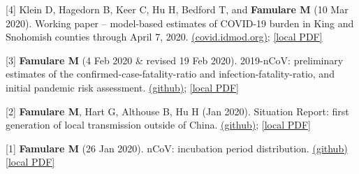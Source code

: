 \documentclass{article}
\begin{document}
\begin{llist}
\begin{items}
	\item[{[4]}]
	Klein D, Hagedorn B, Keer C, Hu H, Bedford T, and \textbf{Famulare M} (10 Mar 2020). Working paper – model-based estimates of COVID-19 burden in King and Snohomish counties through April 7, 2020. \href{https://institutefordiseasemodeling.github.io/COVID-public/reports/Working%20paper%20%E2%80%93%20model-based%20estimates%20of%20COVID-19%20burden%20in%20King%20and%20Snohomish%20counties%20through%20April%207.pdf}{(covid.idmod.org)}; \href{https://famulare.github.io/assets/publication-mirror/Working%20paper%20%E2%80%93%20model-based%20estimates%20of%20COVID-19%20burden%20in%20King%20and%20Snohomish%20counties%20through%20April%207.pdf}{[local PDF]}
	
	\item[{[3]}]
	\textbf{Famulare M} (4 Feb 2020 \& revised 19 Feb 2020). 2019-nCoV: preliminary estimates of the confirmed-case-fatality-ratio and infection-fatality-ratio, and initial pandemic risk assessment. \href{https://institutefordiseasemodeling.github.io/COVID-public/analyses/first_adjusted_mortality_estimates_and_risk_assessment/2019-nCoV-preliminary_age_and_time_adjusted_mortality_rates_and_pandemic_risk_assessment.html}{(github)}; \href{https://famulare.github.io/assets/publication-mirror/2019-nCoV_%20preliminary%20estimates%20of%20the%20confirmed-case-fatality-ratio%20and%20infection-fatality-ratio,%20and%20initial%20pandemic%20risk%20assessment.pdf}{[local PDF]}
	
	\item[{[2]}] \textbf{Famulare M}, Hart G, Althouse B, Hu H (Jan 2020). Situation Report: first generation of local transmission outside of China. \href{https://institutefordiseasemodeling.github.io/COVID-public/analyses/sitRep_local_transmission_outside_China/sitRep_local_transmission_outside_China.html}{(github)}; \href{https://famulare.github.io/assets/publication-mirror/Situation%20Report_%20first%20generation%20of%20local%20transmission%20outside%20of%20China.pdf}{[local PDF]}
	
	\item[{[1]}] \textbf{Famulare M} (26 Jan 2020). nCoV: incubation period distribution. \href{https://institutefordiseasemodeling.github.io/COVID-public/analyses/individual_dynamics_estimates/nCoV_incubation_period.html}{(github)} \; \href{https://famulare.github.io/assets/publication-mirror/nCoV_%20incubation%20period%20distribution.pdf}{[local PDF]}
	
\end{items}



\end{llist}
\end{document}
